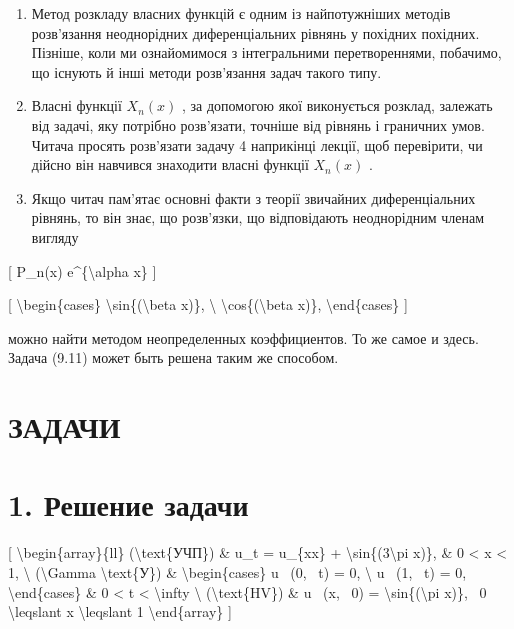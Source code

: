 \documentclass[
]{article}
\begin{document}
\begin{enumerate}
\def\labelenumi{\arabic{enumi}.}
\item
  Метод розкладу власних функцій є одним із найпотужніших методів
  розв'язання неоднорідних диференціальних рівнянь у похідних похідних.
  Пізніше, коли ми ознайомимося з інтегральними перетвореннями,
  побачимо, що існують й інші методи розв'язання задач такого типу.
\item
  Власні функції \(X_n(x)\) , за допомогою якої виконується розклад,
  залежать від задачі, яку потрібно розв'язати, точніше від рівнянь і
  граничних умов. Читача просять розв'язати задачу 4 наприкінці лекції,
  щоб перевірити, чи дійсно він навчився знаходити власні функції
  \(X_n(x)\) .
\item
  Якщо читач пам'ятає основні факти з теорії звичайних диференціальних
  рівнянь, то він знає, що розв'язки, що відповідають неоднорідним
  членам вигляду
\end{enumerate}

{[} P\_n(x) e\^{}\{\textbackslash alpha x\} {]}

{[} \textbackslash begin\{cases\}
\textbackslash sin\{(\textbackslash beta x)\}, \textbackslash{}
\textbackslash cos\{(\textbackslash beta x)\},
\textbackslash end\{cases\} {]}

можно найти методом неопределенных коэффициентов. То же самое и здесь.
Задача (9.11) может быть решена таким же способом.

\section{ЗАДАЧИ}\label{ux437ux430ux434ux430ux447ux438}

\section{1. Решение
задачи}\label{ux440ux435ux448ux435ux43dux438ux435-ux437ux430ux434ux430ux447ux438}

{[} \textbackslash begin\{array\}\{ll\} (\textbackslash text\{УЧП\}) \&
u\_t = u\_\{xx\} + \textbackslash sin\{(3\textbackslash pi x)\}, \& 0
\textless{} x \textless{} 1, \textbackslash{} (\textbackslash Gamma
\textbackslash text\{У\}) \& \textbackslash begin\{cases\} u ~(0, ~t) =
0, \textbackslash{} u ~(1, ~t) = 0, \textbackslash end\{cases\} \& 0
\textless{} t \textless{} \textbackslash infty \textbackslash{}
(\textbackslash text\{HV\}) \& u ~(x, ~0) =
\textbackslash sin\{(\textbackslash pi x)\}, ~0 \textbackslash leqslant
x \textbackslash leqslant 1 \textbackslash end\{array\} {]}
\end{document}
